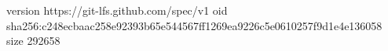 version https://git-lfs.github.com/spec/v1
oid sha256:c248ecbaac258e92393b65e544567ff1269ea9226c5e0610257f9d1e4e136058
size 292658
